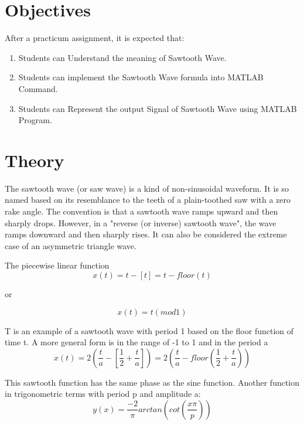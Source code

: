 \documentclass[]{report}
\begin{document}
\section{Objectives}
	\par 
	After a practicum assignment, it is expected that:	
	\begin{enumerate}
		\item Students can Understand the meaning of Sawtooth Wave.
		\item Students can implement the Sawtooth Wave formula into MATLAB Command.
		\item Students can Represent the output Signal of Sawtooth Wave using MATLAB Program.
	\end{enumerate}

\section{Theory}
	\par 
	The sawtooth wave (or saw wave) is a kind of non-sinusoidal waveform. It is so named based on its resemblance to the teeth of a plain-toothed saw with a zero rake angle.
	The convention is that a sawtooth wave ramps upward and then sharply drops. However, in a "reverse (or inverse) sawtooth wave", the wave ramps downward and then sharply rises. It can also be considered the extreme case of an asymmetric triangle wave. \\

	\par 
	The piecewise linear function
	\begin{equation}
		x(t) = t - [t] = t - floor(t)
	\end{equation}
	
	\begin{center}
		or
	\end{center}

	\begin{equation}
		x(t) = t(mod1)
	\end{equation}

	\par
	T is an example of a sawtooth wave with period 1 based on the floor function of time t. A more general form is in the range of -1 to 1 and in the period a
	\begin{equation}
		x(t) = 2 (\frac{t}{a} - [\frac{1}{2} + \frac{t}{a}]) = 2 (\frac{t}{a} - floor(\frac{1}{2} + \frac{t}{a}))
	\end{equation}
	
	\par 
	This sawtooth function has the same phase as the sine function. Another function in trigonometric terms with period p and amplitude a:
	\begin{equation}
		y(x) = \frac{-2}{\pi} arctan (cot(\frac{x\pi}{p}))
	\end{equation}
	
\end{document}
